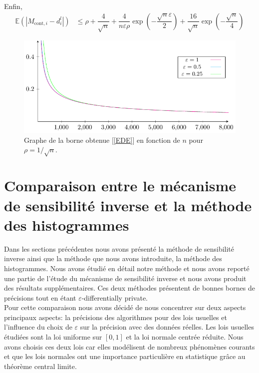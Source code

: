 Enfin, 
\begin{align*}
    \mathbb E(|M_{\text{cont}, i} - d_i^l|) & \leq \rho + \dfrac{4}{\sqrt n} +\dfrac{4}{n\varepsilon\rho}\exp\left( -\dfrac{\sqrt n \varepsilon}{2} \right) + \dfrac{16}{\sqrt{n}}\exp\left( -\dfrac{\sqrt n }{4} \right)
\end{align*}

\begin{figure}[H]
    \centering
    \includegraphics[]{"./proofs/fig6.pdf"}
    \caption{Graphe de la borne obtenue [\ref{EDE}] en fonction de \(n\) pour \(\rho = 1/\sqrt n\).}
\end{figure}





\section{Comparaison entre le mécanisme de sensibilité inverse et la méthode des histogrammes}


Dans les sections précédentes nous avons présenté la méthode de sensibilité inverse ainsi que la méthode que nous avons introduite, la méthode des histogrammes. Nous avons étudié en détail notre méthode et nous avons reporté une partie de l'étude du mécanisme de sensibilité inverse et nous avons produit des résultats supplémentaires. Ces deux méthodes présentent de bonnes bornes de précisions tout en étant \(\varepsilon\)-differentially private.\\

Pour cette comparaison nous avons décidé de nous concentrer sur deux aspects principaux aspects: la précisions des algorithmes pour des lois usuelles et l'influence du choix de \(\varepsilon\) sur la précision avec des données réelles. Les lois usuelles étudiées sont la loi uniforme sur \([0,1]\) et la loi normale centrée réduite. Nous avons choisis ces deux lois car elles modélisent de nombreux phénomènes courants et que les lois normales ont une importance particulière en statistique grâce au théorème central limite.

